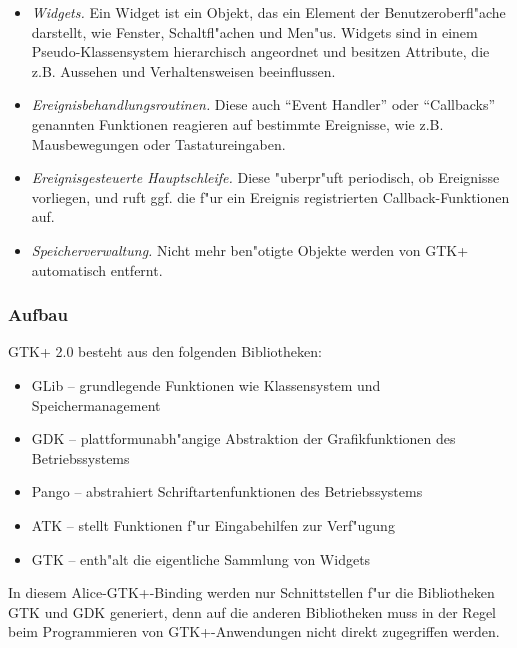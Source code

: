 \documentclass[a4paper,titlepage]{article}
\begin{document}
\begin{itemize}
\item \emph{Widgets.}
      Ein Widget ist ein Objekt, das ein
      Element der Benutzeroberfl"ache darstellt, wie
      Fenster, Schaltfl"achen und Men"us.
      Widgets sind in einem Pseudo-Klassensystem hierarchisch angeordnet
      und besitzen Attribute, die
      z.B. Aussehen und Verhaltensweisen beeinflussen.

\item \emph{Ereignisbehandlungsroutinen.}
      Diese auch ``Event Handler'' oder
      ``Callbacks'' genannten Funktionen reagieren auf bestimmte Ereignisse, 
      wie z.B. Mausbewegungen oder Tastatureingaben.

\item \emph{Ereignisgesteuerte Hauptschleife.} 
      Diese "uberpr"uft periodisch, ob Ereignisse
      vorliegen,
      und ruft ggf. die f"ur ein Ereignis registrierten Callback-Funktionen
      auf.

\item \emph{Speicherverwaltung.} Nicht mehr ben"otigte Objekte werden von
      GTK+ automatisch entfernt.

\end{itemize}

\subsubsection*{Aufbau}
GTK+ 2.0 besteht aus den folgenden Bibliotheken:

\begin{itemize}
\item GLib -- grundlegende Funktionen wie Klassensystem und
      Speichermanagement
\item GDK -- plattformunabh"angige Abstraktion der Grafikfunktionen
      des Betriebssystems
\item Pango -- abstrahiert Schriftartenfunktionen des Betriebssystems
\item ATK -- stellt Funktionen f"ur Eingabehilfen zur Verf"ugung
\item GTK -- enth"alt die eigentliche Sammlung von Widgets
\end{itemize}

In diesem Alice-GTK+-Binding werden nur Schnittstellen f"ur die Bibliotheken
GTK und GDK generiert, denn auf die anderen Bibliotheken muss in der Regel beim
Programmieren von GTK+-Anwendungen nicht direkt zugegriffen werden.\\[\parskip]
\end{document}
